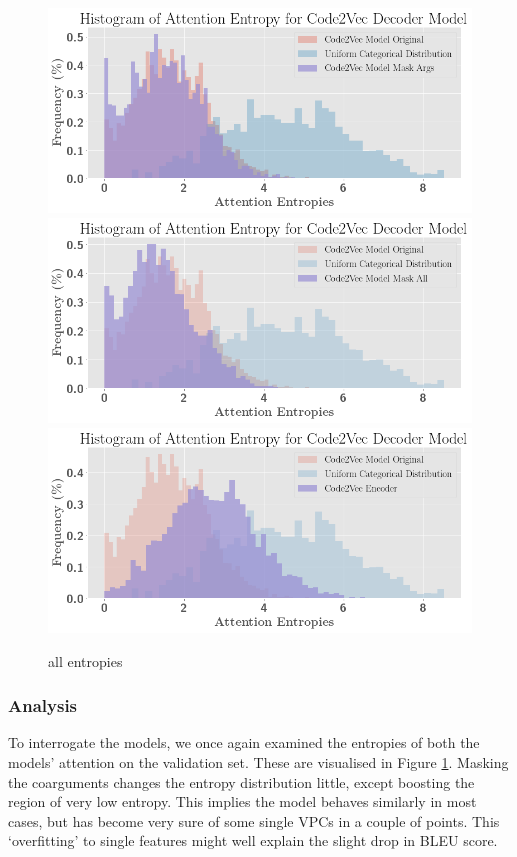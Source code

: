 \begin{figure}
\begin{center}
\includegraphics[width=0.8\linewidth]{ImagesCodeRelated/entropies_mask_args.png} 
\includegraphics[width=0.8\linewidth]{ImagesCodeRelated/entropies_mask_all.png}
\includegraphics[width=0.8\linewidth]{ImagesCodeRelated/entropies_encoder.png}
\end{center}
\caption{all entropies}
\label{fig:all_entropies}
\end{figure}


\subsubsection{Analysis} %

To interrogate the models, we once again examined the entropies of both the models' attention on the validation set. These are visualised in Figure \ref{fig:all_entropies}.
Masking the coarguments changes the entropy distribution little, except boosting the region of very low entropy.
This implies the model behaves similarly in most cases, but has become very sure of some single VPCs in a couple of points.
This `overfitting' to single features might well explain the slight drop in BLEU score.

